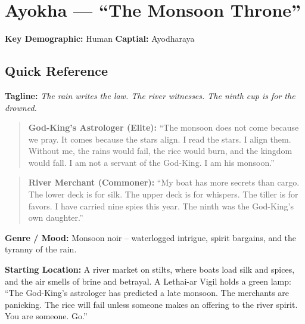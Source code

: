 \section{Ayokha --- ``The Monsoon Throne''}
\label{chap:ayokha}

\textbf{Key Demographic: } Human
\textbf{Captial: } Ayodharaya

\subsection*{Quick Reference}
\textbf{Tagline:} \textit{The rain writes the law. The river witnesses. The ninth cup is for the drowned.}

\begin{quote}
  \textbf{God-King's Astrologer (Elite):}  
  ``The monsoon does not come because we pray. It comes because the stars align. I read the stars. I align them. Without me, the rains would fail, the rice would burn, and the kingdom would fall. I am not a servant of the God-King. I am his monsoon.''
\end{quote}

\begin{quote}
  \textbf{River Merchant (Commoner):}  
  ``My boat has more secrets than cargo. The lower deck is for silk. The upper deck is for whispers. The tiller is for favors. I have carried nine spies this year. The ninth was the God-King's own daughter.''
\end{quote}

\noindent\textbf{Genre / Mood:} Monsoon noir -- waterlogged intrigue, spirit bargains, and the tyranny of the rain.

\noindent\textbf{Starting Location:} A river market on stilts, where boats load silk and spices, and the air smells of brine and betrayal. A Lethai-ar Vigil holds a green lamp: ``The God-King's astrologer has predicted a late monsoon. The merchants are panicking. The rice will fail unless someone makes an offering to the river spirit. You are someone. Go.''

